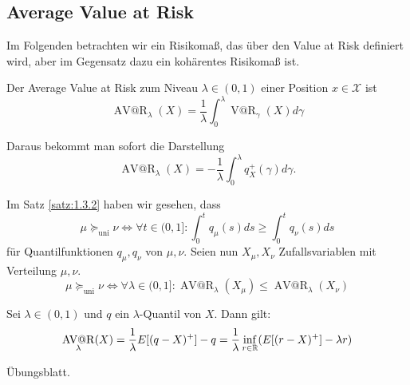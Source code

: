 \documentclass[a4paper,twoside,DIV15,BCOR12mm]{scrbook}
\makeatletter
\newcommand{\cX}{\mathcal X}
\newcommand{\unisucceq}{\succeq_{\text{uni}}}
\DeclareMathOperator{\VatR}{V@R}
\DeclareMathOperator{\AVatR}{AV@R}
\makeatother
\begin{document}
\subsection{Average Value at Risk}
Im Folgenden betrachten wir ein Risikomaß, das über den Value at Risk definiert wird, aber im Gegensatz dazu ein kohärentes Risikomaß ist.
\begin{definition}
Der Average Value at Risk zum Niveau $\lambda\in(0, 1)$ einer Position $x\in\cX$ ist 
\[
\AVatR_\lambda(X) = \frac1\lambda \int_0^\lambda \VatR_\gamma(X)d\gamma
\]
\end{definition}

Daraus bekommt man sofort die Darstellung
\[
\AVatR_\lambda(X) = -\frac1\lambda \int_0^\lambda q_X^+(\gamma)d\gamma.
\]

\begin{bemerkung}
Im Satz \ref{satz:1.3.2} haben wir gesehen, dass
\[
\mu\unisucceq \nu \iff \forall t\in(0, 1]: \int_0^t q_\mu(s)ds \ge \int_0^t q_\nu(s)ds
\]
für Quantilfunktionen $q_\mu,q_\nu$ von $\mu,\nu$. Seien nun $X_\mu,X_\nu$ Zufallsvariablen mit Verteilung $\mu,\nu$.
\[
\mu\unisucceq \nu \iff \forall \lambda\in(0, 1]: \AVatR_\lambda(X_\mu) \le \AVatR_\lambda(X_\nu)
\]
\end{bemerkung}

\begin{lemma}
\label{lemma:1.4.16}Sei $\lambda\in(0, 1)$ und $q$ ein $\lambda$-Quantil von $X$. Dann gilt:
\[
\AVatR_\lambda(X) = \frac1\lambda E[(q-X)^+] - q = \frac1\lambda \inf_{r\in\MdR}(E[(r-X)^+]-\lambda r)
\]
\end{lemma}
\begin{beweis}
Übungsblatt.
\end{beweis}
\end{document}
